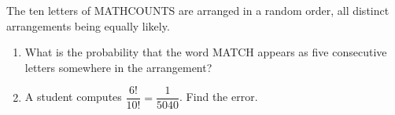 The ten letters of MATHCOUNTS are arranged in a random order, all distinct arrangements being equally likely.
\begin{enumerate}
\item[(a)] What is the probability that the word MATCH appears as five consecutive letters somewhere in the arrangement?
\item[(b)] A student computes $\dfrac{6!}{10!}=\dfrac{1}{5040}$. Find the error.
\end{enumerate}
